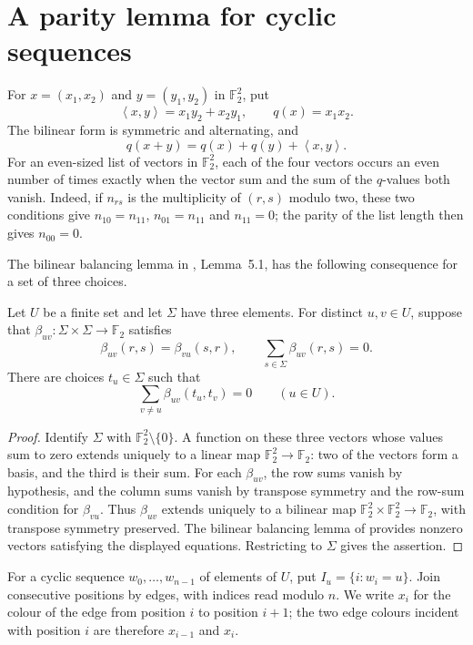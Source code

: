 \documentclass[justified,notoc,twoside,nobib,nofonts]{tufte-handout}
\newcommand{\F}{\mathbb F_2}
\newcommand{\K}{\mathbb F_2^2}
\newcommand{\pair}[2]{\left\langle #1,#2\right\rangle}
\begin{document}
\section{A parity lemma for cyclic sequences}\label{sec:balancing}

For $x=(x_1,x_2)$ and $y=(y_1,y_2)$ in $\K$, put
\[
  \pair{x}{y}=x_1y_2+x_2y_1,\qquad q(x)=x_1x_2.
\]
The bilinear form is symmetric and alternating, and
\begin{equation}\label{eq:quadratic}
  q(x+y)=q(x)+q(y)+\pair{x}{y}.
\end{equation}
For an even-sized list of vectors in $\K$, each of the four vectors
occurs an even number of times exactly when the vector sum and the sum
of the $q$-values both vanish. Indeed, if $n_{rs}$ is the multiplicity
of $(r,s)$ modulo two, these two conditions give
$n_{10}=n_{11}$, $n_{01}=n_{11}$ and $n_{11}=0$; the parity of the
list length then gives $n_{00}=0$.

The bilinear balancing lemma in \citep{U26}, Lemma~5.1,
has the following consequence for a set of three choices.

\begin{lemma}\label{lem:balancing}
Let $U$ be a finite set and let $\Sigma$ have three elements. For
distinct $u,v\in U$, suppose that
$\beta_{uv}:\Sigma\times\Sigma\to\F$ satisfies
\[
  \beta_{uv}(r,s)=\beta_{vu}(s,r),\qquad
  \sum_{s\in\Sigma}\beta_{uv}(r,s)=0.
\]
There are choices $t_u\in\Sigma$ such that
\[
  \sum_{v\ne u}\beta_{uv}(t_u,t_v)=0\qquad(u\in U).
\]
\end{lemma}

\begin{proof}
Identify $\Sigma$ with $\K\setminus\{0\}$. A function on these three
vectors whose values sum to zero extends uniquely to a linear map
$\K\to\F$: two of the vectors form a basis, and the third is their
sum. For each $\beta_{uv}$, the row sums vanish by hypothesis, and
the column sums vanish by transpose symmetry and the row-sum condition
for $\beta_{vu}$. Thus $\beta_{uv}$ extends uniquely to a bilinear map
$\K\times\K\to\F$, with transpose symmetry preserved.
The bilinear balancing lemma of \citep[Lemma~5.1]{U26}
provides nonzero vectors satisfying the displayed equations.
Restricting to $\Sigma$ gives the assertion.
\end{proof}

For a cyclic sequence $w_0,\dots,w_{n-1}$ of elements of $U$, put
$I_u=\{i:w_i=u\}$. Join consecutive positions by edges, with
indices read modulo $n$. We write $x_i$ for the colour of the edge
from position $i$ to position $i+1$; the two edge colours incident
with position $i$ are therefore $x_{i-1}$ and $x_i$.
\end{document}
